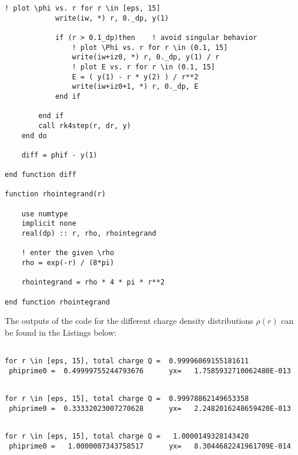 \documentclass[12pt]{article}
\begin{document}
\begin{lstlisting}[frame=single,caption={{\tt elpot.f90}},label=elpot]
            ! plot \phi vs. r for r \in [eps, 15]
            write(iw, *) r, 0._dp, y(1)

            if (r > 0.1_dp)then    ! avoid singular behavior
                ! plot \Phi vs. r for r \in (0.1, 15]
                write(iw+iz0, *) r, 0._dp, y(1) / r
                ! plot E vs. r for r \in (0.1, 15]
                E = ( y(1) - r * y(2) ) / r**2
                write(iw+iz0+1, *) r, 0._dp, E
            end if
     
        end if 
        call rk4step(r, dr, y)
    end do

    diff = phif - y(1) 

end function diff

function rhointegrand(r)

    use numtype
    implicit none
    real(dp) :: r, rho, rhointegrand

    ! enter the given \rho
    rho = exp(-r) / (8*pi)

    rhointegrand = rho * 4 * pi * r**2

end function rhointegrand

\end{lstlisting}

The outputs of the code for the different charge density distributions $\rho(r)$ can be found in the Listings below:

\begin{lstlisting}[frame=single,caption={Output of {\tt elpot.f90} for $\rho(r)=\frac{1}{8\pi}e^{-r}$},label=outputa]

for r \in [eps, 15], total charge Q =  0.99996069155181611     
 phiprime0 =  0.49999755244793676      yx=   1.7585932710062480E-013

\end{lstlisting}

\begin{lstlisting}[frame=single,caption={Output of {\tt elpot.f90} for $\rho(r)=\frac{1}{24\pi}re^{-r}$},label=outputb]

for r \in [eps, 15], total charge Q =  0.99978862149653358     
 phiprime0 =  0.33332023007270628      yx=   2.2482016248659420E-013

\end{lstlisting}

\begin{lstlisting}[frame=single,caption={Output of {\tt elpot.f90} for $\rho(r)=\frac{1}{2\pi}\sin(r)e^{-r}$},label=outputc]

for r \in [eps, 15], total charge Q =   1.0000149328143420     
 phiprime0 =   1.0000007343758517      yx=   8.3044682241961709E-014

\end{lstlisting}
\end{document}

